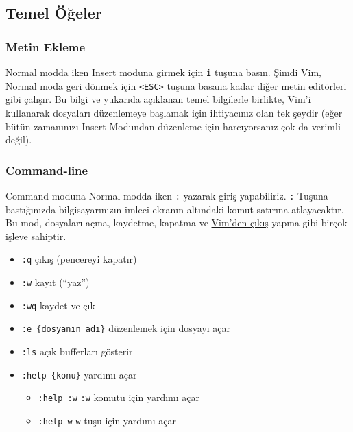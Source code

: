 \documentclass[
]{book}
\providecommand{\tightlist}{%
  \setlength{\itemsep}{0pt}\setlength{\parskip}{0pt}}
\begin{document}
\hypertarget{temel-uxf6ux11feler}{%
\subsection*{Temel Öğeler}\label{temel-uxf6ux11feler}}

\hypertarget{metin-ekleme}{%
\subsubsection*{Metin Ekleme}\label{metin-ekleme}}

Normal modda iken Insert moduna girmek için \texttt{i} tuşuna basın. Şimdi Vim, Normal moda geri dönmek için \texttt{\textless{}ESC\textgreater{}} tuşuna basana kadar diğer metin editörleri gibi çalışır. Bu bilgi ve yukarıda açıklanan temel bilgilerle birlikte, Vim'i kullanarak dosyaları düzenlemeye başlamak için ihtiyacınız olan tek şeydir (eğer bütün zamanınızı Insert Modundan düzenleme için harcıyorsanız çok da verimli değil).

\hypertarget{command-line}{%
\subsubsection*{Command-line}\label{command-line}}

Command moduna Normal modda iken \texttt{:} yazarak giriş yapabiliriz. \texttt{:} Tuşuna bastığınızda bilgisayarınızın imleci ekranın altındaki komut satırına atlayacaktır. Bu mod, dosyaları açma, kaydetme, kapatma ve \href{https://twitter.com/iamdevloper/status/435555976687923200}{Vim'den çıkış} yapma gibi birçok işleve sahiptir.

\begin{itemize}
\tightlist
\item
  \texttt{:q} çıkış (pencereyi kapatır)
\item
  \texttt{:w} kayıt (``yaz'')
\item
  \texttt{:wq} kaydet ve çık
\item
  \texttt{:e\ \{dosyanın\ adı\}} düzenlemek için dosyayı açar
\item
  \texttt{:ls} açık bufferları gösterir
\item
  \texttt{:help\ \{konu\}} yardımı açar

  \begin{itemize}
  \tightlist
  \item
    \texttt{:help\ :w} \texttt{:w} komutu için yardımı açar
  \item
    \texttt{:help\ w} \texttt{w} tuşu için yardımı açar
  \end{itemize}
\end{itemize}
\end{document}
